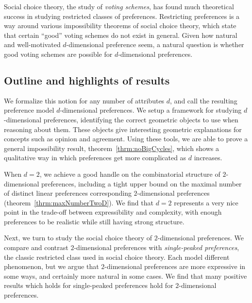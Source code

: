 \documentclass[12pt]{article}
\newcommand{\1}[1]{\mathds{1}[{#1}]}
\begin{document}
  Social choice theory, the study of \emph{voting schemes},
  has found much theoretical success in studying restricted classes of preferences.
  Restricting preferences is a way around various impossibility theorems of
  social choice theory, which state that certain ``good'' voting schemes do not
  exist in general. Given how natural and well-motivated $d$-dimensional
  preference seem, a natural question is whether good voting schemes are
  possible for $d$-dimensional preferences.

  \subsection{Outline and highlights of results}
    We formalize this notion for any number of attributes $d$,
    and call the resulting preference model $d$-dimensional preferences.
    We setup a framework for studying $d$-dimensional preferences,
    identifying the correct geometric objects to use when reasoning about them.
    These objects give interesting geometric explanations for concepts such as
    opinion and agreement.
    Using these tools, we are able to prove a general impossibility result,
    theorem~\ref{thrm:noBigCycles}, which shows
    a qualitative way in which preferences get more complicated as $d$ increases.

    When $d=2$, we achieve a good handle on the combinatorial structure of
    $2$-dimensional preferences, including
    a tight upper bound on the maximal number of
    distinct linear preferences corresponding
    $2$-dimensional preferences (theorem~\ref{thrm:maxNumberTwoD}).
    We find that $d=2$ represents a very nice point in the trade-off
    between expressibility and complexity, with enough preferences to be
    realistic while still having strong structure.

    Next, we turn to study the social choice theory of $2$-dimensional
    preferences. We compare and contrast $2$-dimensional preferences with 
    \emph{single-peaked preferences}, the
    classic restricted class used in social choice theory.
    Each model different phenomenon, but we argue that $2$-dimensional
    preferences are more expressive in some ways, and certainly more natural in
    some cases. We find that many positive results which holds for
    single-peaked preferences hold for $2$-dimensional preferences.








\clearpage
\end{document}
